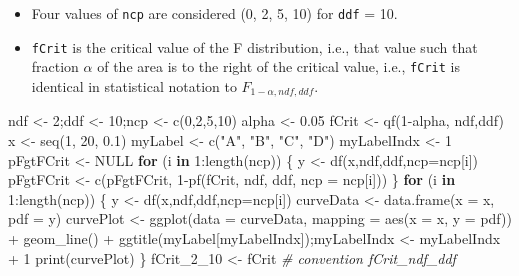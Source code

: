 \documentclass[
]{book}
\newenvironment{Shaded}{\begin{snugshade}}{\end{snugshade}}
\newcommand{\AttributeTok}[1]{\textcolor[rgb]{0.77,0.63,0.00}{#1}}
\newcommand{\CommentTok}[1]{\textcolor[rgb]{0.56,0.35,0.01}{\textit{#1}}}
\newcommand{\ConstantTok}[1]{\textcolor[rgb]{0.00,0.00,0.00}{#1}}
\newcommand{\ControlFlowTok}[1]{\textcolor[rgb]{0.13,0.29,0.53}{\textbf{#1}}}
\newcommand{\DecValTok}[1]{\textcolor[rgb]{0.00,0.00,0.81}{#1}}
\newcommand{\FloatTok}[1]{\textcolor[rgb]{0.00,0.00,0.81}{#1}}
\newcommand{\FunctionTok}[1]{\textcolor[rgb]{0.00,0.00,0.00}{#1}}
\newcommand{\NormalTok}[1]{#1}
\newcommand{\OtherTok}[1]{\textcolor[rgb]{0.56,0.35,0.01}{#1}}
\newcommand{\SpecialCharTok}[1]{\textcolor[rgb]{0.00,0.00,0.00}{#1}}
\newcommand{\StringTok}[1]{\textcolor[rgb]{0.31,0.60,0.02}{#1}}
\providecommand{\tightlist}{%
  \setlength{\itemsep}{0pt}\setlength{\parskip}{0pt}}
\begin{document}
\begin{itemize}
\tightlist
\item
  Four values of \texttt{ncp} are considered (0, 2, 5, 10) for \texttt{ddf} = 10.
\item
  \texttt{fCrit} is the critical value of the F distribution, i.e., that value such that fraction \(\alpha\) of the area is to the right of the critical value, i.e., \texttt{fCrit} is identical in statistical notation to \({{F}_{1-\alpha ,ndf,ddf}}\).
\end{itemize}

\begin{Shaded}
\begin{Highlighting}[]
\NormalTok{ndf }\OtherTok{\textless{}{-}} \DecValTok{2}\NormalTok{;ddf }\OtherTok{\textless{}{-}} \DecValTok{10}\NormalTok{;ncp }\OtherTok{\textless{}{-}} \FunctionTok{c}\NormalTok{(}\DecValTok{0}\NormalTok{,}\DecValTok{2}\NormalTok{,}\DecValTok{5}\NormalTok{,}\DecValTok{10}\NormalTok{)}
\NormalTok{alpha }\OtherTok{\textless{}{-}} \FloatTok{0.05}
\NormalTok{fCrit }\OtherTok{\textless{}{-}} \FunctionTok{qf}\NormalTok{(}\DecValTok{1}\SpecialCharTok{{-}}\NormalTok{alpha, ndf,ddf)}
\NormalTok{x }\OtherTok{\textless{}{-}} \FunctionTok{seq}\NormalTok{(}\DecValTok{1}\NormalTok{, }\DecValTok{20}\NormalTok{, }\FloatTok{0.1}\NormalTok{)}
\NormalTok{myLabel }\OtherTok{\textless{}{-}} \FunctionTok{c}\NormalTok{(}\StringTok{"A"}\NormalTok{, }\StringTok{"B"}\NormalTok{, }\StringTok{"C"}\NormalTok{, }\StringTok{"D"}\NormalTok{)}
\NormalTok{myLabelIndx }\OtherTok{\textless{}{-}} \DecValTok{1}
\NormalTok{pFgtFCrit }\OtherTok{\textless{}{-}} \ConstantTok{NULL}
\ControlFlowTok{for}\NormalTok{ (i }\ControlFlowTok{in} \DecValTok{1}\SpecialCharTok{:}\FunctionTok{length}\NormalTok{(ncp))}
\NormalTok{\{}
\NormalTok{  y }\OtherTok{\textless{}{-}} \FunctionTok{df}\NormalTok{(x,ndf,ddf,}\AttributeTok{ncp=}\NormalTok{ncp[i])}
\NormalTok{  pFgtFCrit }\OtherTok{\textless{}{-}} \FunctionTok{c}\NormalTok{(pFgtFCrit, }\DecValTok{1}\SpecialCharTok{{-}}\FunctionTok{pf}\NormalTok{(fCrit, ndf, ddf, }\AttributeTok{ncp =}\NormalTok{ ncp[i]))}
\NormalTok{\}  }
\ControlFlowTok{for}\NormalTok{ (i }\ControlFlowTok{in} \DecValTok{1}\SpecialCharTok{:}\FunctionTok{length}\NormalTok{(ncp))}
\NormalTok{\{}
\NormalTok{  y }\OtherTok{\textless{}{-}} \FunctionTok{df}\NormalTok{(x,ndf,ddf,}\AttributeTok{ncp=}\NormalTok{ncp[i])}
\NormalTok{  curveData }\OtherTok{\textless{}{-}} \FunctionTok{data.frame}\NormalTok{(}\AttributeTok{x =}\NormalTok{ x, }\AttributeTok{pdf =}\NormalTok{ y)}
\NormalTok{  curvePlot }\OtherTok{\textless{}{-}} \FunctionTok{ggplot}\NormalTok{(}\AttributeTok{data =}\NormalTok{ curveData, }\AttributeTok{mapping =} \FunctionTok{aes}\NormalTok{(}\AttributeTok{x =}\NormalTok{ x, }\AttributeTok{y =}\NormalTok{ pdf)) }\SpecialCharTok{+} 
    \FunctionTok{geom\_line}\NormalTok{() }\SpecialCharTok{+}
    \FunctionTok{ggtitle}\NormalTok{(myLabel[myLabelIndx]);myLabelIndx }\OtherTok{\textless{}{-}}\NormalTok{ myLabelIndx }\SpecialCharTok{+} \DecValTok{1}
  \FunctionTok{print}\NormalTok{(curvePlot)}
\NormalTok{\}}
\NormalTok{fCrit\_2\_10 }\OtherTok{\textless{}{-}}\NormalTok{ fCrit }\CommentTok{\# convention fCrit\_ndf\_ddf}
\end{Highlighting}
\end{Shaded}
\end{document}
